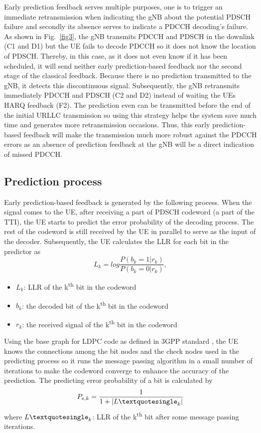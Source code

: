\documentclass[conference]{IEEEtran}
\begin{document}
Early prediction feedback serves multiple purposes, one is to trigger an immediate retransmission when indicating the gNB about the potential PDSCH failure and secondly its absence serves to indicate a PDCCH decoding's failure. As shown in Fig.~\ref{fig3}, the gNB transmits PDCCH and PDSCH in the downlink (C1 and D1) but the UE fails to decode PDCCH so it does not know the location of PDSCH. Thereby, in this case, as it does not even know if it has been scheduled, it will send neither early prediction-based feedback nor the second stage of the classical feedback. Because there is no prediction transmitted to the gNB, it detects this discontinuous signal. Subsequently, the gNB retransmits immediately PDCCH and PDSCH (C2 and D2) instead of waiting the UE\textquotesingle s HARQ feedback (F2). The prediction even can be transmitted before the end of the initial URLLC transmission so using this strategy helps the system save much time and generates more retransmission occasions. Thus, this early prediction-based feedback will make the transmission much more robust against the PDCCH errors as an absence of prediction feedback at the gNB will be a direct indication of missed PDCCH. 

\subsection{Prediction process}\label{BB}
Early prediction-based feedback is generated by the following process. When the signal comes to the UE, after receiving a part of PDSCH codeword (a part of the TTI), the UE starts to predict the error probability of the decoding process. The rest of the codeword is still received by the UE in parallel to serve as the input of the decoder. Subsequently, the UE calculates the LLR for each bit in the predictor as
\begin{equation}
    L_{k} = log \frac{P(b_{k}=1|r_{k})}{P(b_{k}=0|r_{k})},
\end{equation}
\begin{itemize}
    \item $L_{k}$: LLR of the k\textsuperscript{th} bit in the codeword 
    \item $b_{k}$: the decoded bit of the k\textsuperscript{th} bit in the codeword
    \item $r_{k}$: the received signal of the k\textsuperscript{th} bit in the codeword
\end{itemize}

Using the base graph for LDPC code as defined in 3GPP standard \cite{b8}, the UE knows the connections among the bit nodes and the check nodes used in the predicting process so it runs the message passing algorithm in a small number of iterations to make the codeword converge to enhance the accuracy of the prediction. The predicting error probability of a bit is calculated by
\begin{equation}
    P_{e,k} = \frac{1}{1 + |L\textquotesingle_{k}|}
\end{equation}
where $L\textquotesingle_{k}$: LLR of the k\textsuperscript{th} bit after some message passing iterations.
\end{document}
